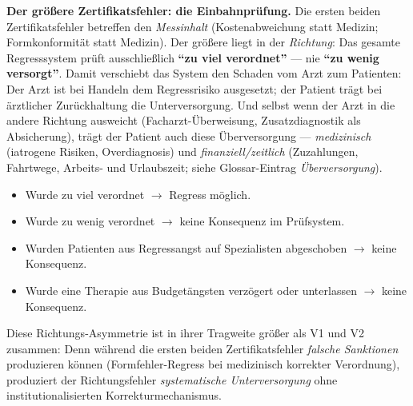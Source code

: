 \documentclass{umbruch-position}
\begin{document}
\medskip
\noindent\textbf{Der gr\"o\ss{}ere Zertifikatsfehler: die Einbahnpr\"ufung.} Die ersten beiden Zertifikatsfehler betreffen den \emph{Messinhalt} (Kostenabweichung statt Medizin; Formkonformit\"at statt Medizin). Der gr\"o\ss{}ere liegt in der \emph{Richtung}: Das gesamte Regresssystem pr\"uft ausschlie\ss{}lich \textbf{``zu viel verordnet''} --- nie \textbf{``zu wenig versorgt''}. Damit verschiebt das System den Schaden vom Arzt zum Patienten: Der Arzt ist bei Handeln dem Regressrisiko ausgesetzt; der Patient tr\"agt bei \"arztlicher Zur\"uckhaltung die Unterversorgung. Und selbst wenn der Arzt in die andere Richtung ausweicht (Facharzt-\"Uberweisung, Zusatzdiagnostik als Absicherung), tr\"agt der Patient auch diese \"Uberversorgung --- \textit{medizinisch} (iatrogene Risiken, Overdiagnosis) und \textit{finanziell/zeitlich} (Zuzahlungen, Fahrtwege, Arbeits- und Urlaubszeit; siehe Glossar-Eintrag \textit{\"Uberversorgung}).

\begin{itemize}[nosep]
  \item Wurde zu viel verordnet $\to$ Regress m\"oglich.
  \item Wurde zu wenig verordnet $\to$ keine Konsequenz im Pr\"ufsystem.
  \item Wurden Patienten aus Regressangst auf Spezialisten abgeschoben $\to$ keine Konsequenz.
  \item Wurde eine Therapie aus Budget\"angsten verz\"ogert oder unterlassen $\to$ keine Konsequenz.
\end{itemize}

Diese Richtungs-Asymmetrie ist in ihrer Tragweite gr\"o\ss{}er als V1 und V2 zusammen: Denn w\"ahrend die ersten beiden Zertifikatsfehler \emph{falsche Sanktionen} produzieren k\"onnen (Formfehler-Regress bei medizinisch korrekter Verordnung), produziert der Richtungsfehler \emph{systematische Unterversorgung} ohne institutionalisierten Korrekturmechanismus.
\end{document}

